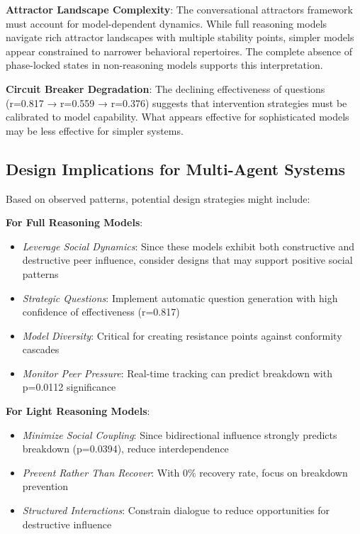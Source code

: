 \documentclass[11pt,letterpaper]{article}
\newcommand{\exponedataQuestionCorrelation}{0.817}
\newcommand{\exponedataPeerPressureANOVAPValue}{p=0.0112}
\newcommand{\exptwoQuestionCorrelation}{0.559}
\newcommand{\exptwoBidirectionalPValue}{p=0.0394}
\newcommand{\expthreeQuestionCorrelation}{0.376}
\begin{document}
\textbf{Attractor Landscape Complexity}: The conversational attractors framework must account for model-dependent dynamics. While full reasoning models navigate rich attractor landscapes with multiple stability points, simpler models appear constrained to narrower behavioral repertoires. The complete absence of phase-locked states in non-reasoning models supports this interpretation.

\textbf{Circuit Breaker Degradation}: The declining effectiveness of questions (r=\exponedataQuestionCorrelation{} → r=\exptwoQuestionCorrelation{} → r=\expthreeQuestionCorrelation{}) suggests that intervention strategies must be calibrated to model capability. What appears effective for sophisticated models may be less effective for simpler systems.

\subsection{Design Implications for Multi-Agent Systems}

Based on observed patterns, potential design strategies might include:

\textbf{For Full Reasoning Models}:
\begin{itemize}
    \item \textit{Leverage Social Dynamics}: Since these models exhibit both constructive and destructive peer influence, consider designs that may support positive social patterns
    \item \textit{Strategic Questions}: Implement automatic question generation with high confidence of effectiveness (r=\exponedataQuestionCorrelation{})
    \item \textit{Model Diversity}: Critical for creating resistance points against conformity cascades
    \item \textit{Monitor Peer Pressure}: Real-time tracking can predict breakdown with \exponedataPeerPressureANOVAPValue{} significance
\end{itemize}

\textbf{For Light Reasoning Models}:
\begin{itemize}
    \item \textit{Minimize Social Coupling}: Since bidirectional influence strongly predicts breakdown (\exptwoBidirectionalPValue{}), reduce interdependence
    \item \textit{Prevent Rather Than Recover}: With 0\% recovery rate, focus on breakdown prevention
    \item \textit{Structured Interactions}: Constrain dialogue to reduce opportunities for destructive influence
\end{itemize}
\end{document}
